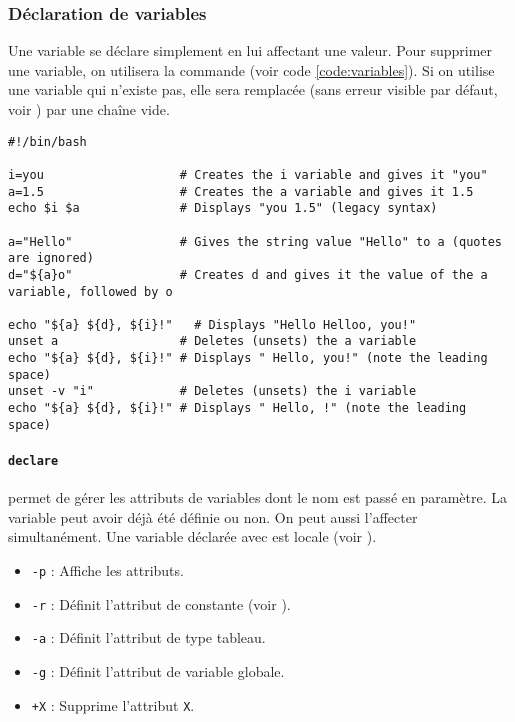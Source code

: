 \subsubsection{Déclaration de variables} 

Une variable se déclare simplement en lui affectant une valeur. Pour supprimer une variable, on utilisera la commande  (voir code \ref{code:variables}). Si on utilise une variable qui n'existe pas, elle sera remplacée (sans erreur visible par défaut, voir ) par une chaîne vide.
\begin{code}
    \begin{verbatim}
#!/bin/bash

i=you                   # Creates the i variable and gives it "you"
a=1.5                   # Creates the a variable and gives it 1.5
echo $i $a              # Displays "you 1.5" (legacy syntax)

a="Hello"               # Gives the string value "Hello" to a (quotes are ignored)
d="${a}o"               # Creates d and gives it the value of the a variable, followed by o

echo "${a} ${d}, ${i}!"   # Displays "Hello Helloo, you!"
unset a                 # Deletes (unsets) the a variable
echo "${a} ${d}, ${i}!" # Displays " Hello, you!" (note the leading space)
unset -v "i"            # Deletes (unsets) the i variable
echo "${a} ${d}, ${i}!" # Displays " Hello, !" (note the leading space)
    \end{verbatim}

    \vspace{-0.5cm}
    \label{code:variables}
\end{code}

\paragraph{\texttt{declare}}
 permet de gérer les attributs de variables dont le nom est passé en paramètre. La variable peut avoir déjà été définie ou non. On peut aussi l'affecter simultanément. Une variable déclarée avec  est locale (voir ).
\begin{itemize}
    \item \texttt{-p} : Affiche les attributs.
    \item \texttt{-r} : Définit l'attribut de constante (voir ).
    \item \texttt{-a} : Définit l'attribut de type tableau.
    \item \texttt{-g} : Définit l'attribut de variable globale.
    \item \texttt{+X} : Supprime l'attribut \texttt{X}.
\end{itemize}

